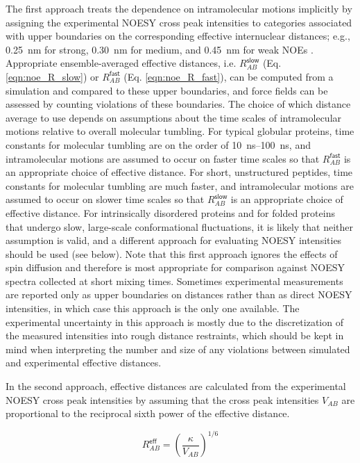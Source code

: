 \documentclass[9pt,review]{livecoms}
\begin{document}
The first approach treats the dependence on intramolecular motions implicitly by assigning the experimental NOESY cross peak intensities to categories associated with upper boundaries on the corresponding effective internuclear distances; e.g., \qty{0.25}{\nano\meter} for strong, \qty{0.30}{\nano\meter} for medium, and \qty{0.45}{\nano\meter} for weak NOEs \cite{smith_structure_1993}.
Appropriate ensemble-averaged effective distances, i.e. $R_{AB}^{\mathsf{slow}}$ (Eq. \ref{eqn:noe_R_slow}) or $R_{AB}^{\mathsf{fast}}$ (Eq. \ref{eqn:noe_R_fast}), can be computed from a simulation and compared to these upper boundaries, and force fields can be assessed by counting violations of these boundaries.
The choice of which distance average to use depends on assumptions about the time scales of intramolecular motions relative to overall molecular tumbling.
For typical globular proteins, time constants for molecular tumbling are on the order of \qtyrange{10}{100}{\nano\second}, and intramolecular motions are assumed to occur on faster time scales so that $R_{AB}^{\mathsf{fast}}$ is an appropriate choice of effective distance.
For short, unstructured peptides, time constants for molecular tumbling are much faster, and intramolecular motions are assumed to occur on slower time scales so that $R_{AB}^{\mathsf{slow}}$ is an appropriate choice of effective distance.
For intrinsically disordered proteins and for folded proteins that undergo slow, large-scale conformational fluctuations, it is likely that neither assumption is valid, and a different approach for evaluating NOESY intensities should be used (see below).
Note that this first approach ignores the effects of spin diffusion and therefore is most appropriate for comparison against NOESY spectra collected at short mixing times.
Sometimes experimental measurements are reported only as upper boundaries on distances rather than as direct NOESY intensities, in which case this approach is the only one available.
The experimental uncertainty in this approach is mostly due to the discretization of the measured intensities into rough distance restraints, which should be kept in mind when interpreting the number and size of any violations between simulated and experimental effective distances.

In the second approach, effective distances are calculated from the experimental NOESY cross peak intensities by assuming that the cross peak intensities $V_{AB}$ are proportional to the reciprocal sixth power of the effective distance.

\begin{equation}
\label{eqn:noesy_sixth_power}
R_{AB}^{\mathsf{eff}} = \left( \frac {\kappa} {V_{AB}} \right)^{1/6}
\end{equation}
\end{document}
